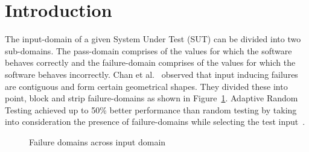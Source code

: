 \documentclass[runningheads,a4paper]{llncs}
\begin{document}
\section{Introduction}
The input-domain of a given System Under Test (SUT) can be divided into two sub-domains. The pass-domain comprises of the values for which the software behaves correctly and the failure-domain comprises of the values for which the software behaves incorrectly. Chan et al.~\cite{chan1996proportional} observed that input inducing failures are contiguous and form certain geometrical shapes. They divided these into point, block and strip failure-domains as shown in Figure~\ref{fig:patterns}. Adaptive Random Testing achieved up to 50\% better performance than random testing by taking into consideration the presence of failure-domains while selecting the test input~\cite{Chen2008}.

\smallskip
\begin{figure} [H]
\centering
{}
\smallskip
\caption{Failure domains across input domain~\cite{chan1996proportional}}
\label{fig:patterns}
\end{figure} 

\end{document}
